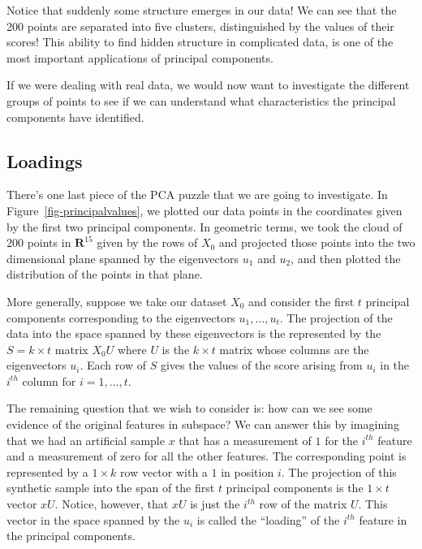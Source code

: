 \documentclass[
  11pt,
  letterpaper,
]{scrbook}
\theoremstyle{plain}
\theoremstyle{remark}
\begin{document}
Notice that suddenly some structure emerges in our data! We can see that
the 200 points are separated into five clusters, distinguished by the
values of their scores! This ability to find hidden structure in
complicated data, is one of the most important applications of principal
components.

If we were dealing with real data, we would now want to investigate the
different groups of points to see if we can understand what
characteristics the principal components have identified.

\hypertarget{loadings}{%
\subsection{Loadings}\label{loadings}}

There's one last piece of the PCA puzzle that we are going to
investigate. In Figure~\ref{fig-principalvalues}, we plotted our data
points in the coordinates given by the first two principal components.
In geometric terms, we took the cloud of \(200\) points in
\(\mathbf{R}^{15}\) given by the rows of \(X_{0}\) and projected those
points into the two dimensional plane spanned by the eigenvectors
\(u_{1}\) and \(u_{2}\), and then plotted the distribution of the points
in that plane.

More generally, suppose we take our dataset \(X_{0}\) and consider the
first \(t\) principal components corresponding to the eigenvectors
\(u_{1},\ldots, u_{t}\). The projection of the data into the space
spanned by these eigenvectors is the represented by the
\(S = k\times t\) matrix \(X_{0}U\) where \(U\) is the \(k\times t\)
matrix whose columns are the eigenvectors \(u_{i}\). Each row of \(S\)
gives the values of the score arising from \(u_{i}\) in the \(i^{th}\)
column for \(i=1,\ldots, t\).

The remaining question that we wish to consider is: how can we see some
evidence of the original features in subspace? We can answer this by
imagining that we had an artificial sample \(x\) that has a measurement
of \(1\) for the \(i^{th}\) feature and a measurement of zero for all
the other features. The corresponding point is represented by a
\(1\times k\) row vector with a \(1\) in position \(i\). The projection
of this synthetic sample into the span of the first \(t\) principal
components is the \(1\times t\) vector \(xU\). Notice, however, that
\(xU\) is just the \(i^{th}\) row of the matrix \(U\). This vector in
the space spanned by the \(u_{i}\) is called the ``loading'' of the
\(i^{th}\) feature in the principal components.
\end{document}
